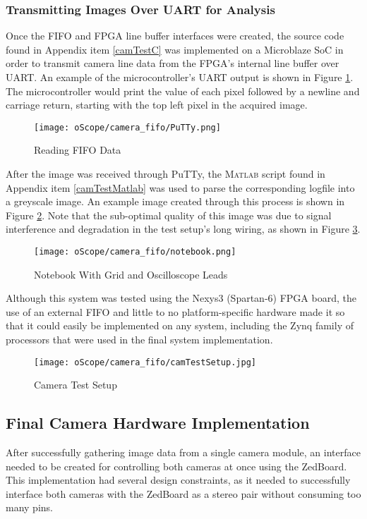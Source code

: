 \subsubsection{Transmitting Images Over UART for Analysis} \label{UARTimg}
Once the FIFO and FPGA line buffer interfaces were created, the source code found in Appendix item \ref{camTestC} was implemented on a Microblaze SoC in order to transmit camera line data from the FPGA's internal line buffer over UART. An example of the microcontroller's UART output is shown in Figure \ref{PuTTYfifoData}. The microcontroller would print the value of each pixel followed by a newline and carriage return, starting with the top left pixel in the acquired image. 
\begin{figure}[H]
	\centerline{\texttt{[image: oScope/camera\_fifo/PuTTy.png]}}
	\caption{Reading FIFO Data}
	\label{PuTTYfifoData}
\end{figure}
\par
After the image was received through PuTTy, the \textsc{Matlab} script found in Appendix item \ref{camTestMatlab} was used to parse the corresponding logfile into a greyscale image. An example image created through this process is shown in Figure \ref{notebookImage}. Note that the sub-optimal quality of this image was due to signal interference and degradation in the test setup's long wiring, as shown in Figure \ref{camTestSetup}. 
\begin{figure}[H]
	\centerline{\texttt{[image: oScope/camera\_fifo/notebook.png]}}
	\caption{Notebook With Grid and Oscilloscope Leads}
	\label{notebookImage}
\end{figure}
\par
Although this system was tested using the Nexys3 (Spartan-6) FPGA board, the use of an external FIFO and little to no platform-specific hardware made it so that it could easily be implemented on any system, including the Zynq family of processors that were used in the final system implementation.   
\begin{figure}[H]
	\centerline{\texttt{[image: oScope/camera\_fifo/camTestSetup.jpg]}}
	\caption{Camera Test Setup}
	\label{camTestSetup}
\end{figure}

\subsection{Final Camera Hardware Implementation}
After successfully gathering image data from a single camera module, an interface needed to be created for controlling both cameras at once using the ZedBoard. This implementation had several design constraints, as it needed to successfully interface both cameras with the ZedBoard as a stereo pair without consuming too many pins. 
